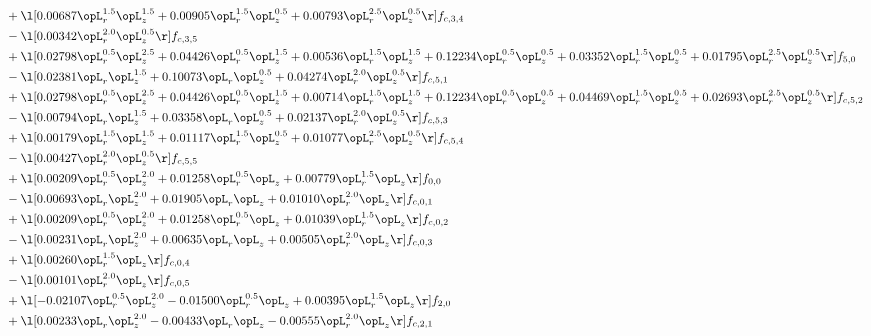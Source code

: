 \begin{alignat}{2}
& + \l[  0.00687 \opL_r^{1.5} \opL_z^{1.5} +  0.00905 \opL_r^{1.5} \opL_z^{0.5} +  0.00793 \opL_r^{2.5} \opL_z^{0.5}  \r] f_{c,3,4} \nonumber \\ 
& - \l[  0.00342 \opL_r^{2.0} \opL_z^{0.5}  \r] f_{c,3,5} \nonumber \\ 
& + \l[  0.02798 \opL_r^{0.5} \opL_z^{2.5} +  0.04426 \opL_r^{0.5} \opL_z^{1.5} +  0.00536 \opL_r^{1.5} \opL_z^{1.5} +  0.12234 \opL_r^{0.5} \opL_z^{0.5} +  0.03352 \opL_r^{1.5} \opL_z^{0.5} +  0.01795 \opL_r^{2.5} \opL_z^{0.5}  \r] f_{5,0} \nonumber \\ 
& - \l[  0.02381 \opL_r \opL_z^{1.5} +  0.10073 \opL_r \opL_z^{0.5} +  0.04274 \opL_r^{2.0} \opL_z^{0.5}  \r] f_{c,5,1} \nonumber \\ 
& + \l[  0.02798 \opL_r^{0.5} \opL_z^{2.5} +  0.04426 \opL_r^{0.5} \opL_z^{1.5} +  0.00714 \opL_r^{1.5} \opL_z^{1.5} +  0.12234 \opL_r^{0.5} \opL_z^{0.5} +  0.04469 \opL_r^{1.5} \opL_z^{0.5} +  0.02693 \opL_r^{2.5} \opL_z^{0.5}  \r] f_{c,5,2} \nonumber \\ 
& - \l[  0.00794 \opL_r \opL_z^{1.5} +  0.03358 \opL_r \opL_z^{0.5} +  0.02137 \opL_r^{2.0} \opL_z^{0.5}  \r] f_{c,5,3} \nonumber \\ 
& + \l[  0.00179 \opL_r^{1.5} \opL_z^{1.5} +  0.01117 \opL_r^{1.5} \opL_z^{0.5} +  0.01077 \opL_r^{2.5} \opL_z^{0.5}  \r] f_{c,5,4} \nonumber \\ 
& - \l[  0.00427 \opL_r^{2.0} \opL_z^{0.5}  \r] f_{c,5,5} \nonumber \\ 
& + \l[  0.00209 \opL_r^{0.5} \opL_z^{2.0} +  0.01258 \opL_r^{0.5} \opL_z +  0.00779 \opL_r^{1.5} \opL_z  \r] f_{0,0} \nonumber \\ 
& - \l[  0.00693 \opL_r \opL_z^{2.0} +  0.01905 \opL_r \opL_z +  0.01010 \opL_r^{2.0} \opL_z  \r] f_{c,0,1} \nonumber \\ 
& + \l[  0.00209 \opL_r^{0.5} \opL_z^{2.0} +  0.01258 \opL_r^{0.5} \opL_z +  0.01039 \opL_r^{1.5} \opL_z  \r] f_{c,0,2} \nonumber \\ 
& - \l[  0.00231 \opL_r \opL_z^{2.0} +  0.00635 \opL_r \opL_z +  0.00505 \opL_r^{2.0} \opL_z  \r] f_{c,0,3} \nonumber \\ 
& + \l[  0.00260 \opL_r^{1.5} \opL_z  \r] f_{c,0,4} \nonumber \\ 
& - \l[  0.00101 \opL_r^{2.0} \opL_z  \r] f_{c,0,5} \nonumber \\ 
& + \l[  -0.02107 \opL_r^{0.5} \opL_z^{2.0}   -0.01500 \opL_r^{0.5} \opL_z +  0.00395 \opL_r^{1.5} \opL_z  \r] f_{2,0} \nonumber \\ 
& + \l[  0.00233 \opL_r \opL_z^{2.0}   -0.00433 \opL_r \opL_z   -0.00555 \opL_r^{2.0} \opL_z  \r] f_{c,2,1} \nonumber \\ 

\end{alignat}
